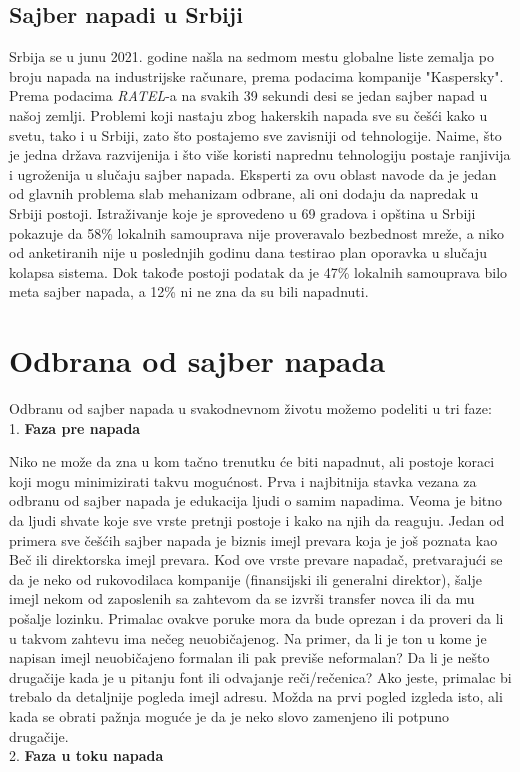 \documentclass[a4paper]{article}
\begin{document}
{\subsection{Sajber napadi u Srbiji}

Srbija se u junu 2021. godine našla na sedmom mestu globalne liste zemalja po broju napada na industrijske računare, prema podacima kompanije "Kaspersky". Prema podacima \emph{RATEL}-a na svakih 39 sekundi desi se jedan sajber napad u našoj zemlji.
Problemi koji nastaju zbog hakerskih napada sve su češći kako u svetu, tako i u Srbiji, zato što postajemo sve zavisniji od tehnologije. Naime, što je jedna država razvijenija i što više koristi naprednu tehnologiju postaje ranjivija i ugroženija u slučaju sajber napada.
Eksperti za ovu oblast navode da je jedan od glavnih problema slab mehanizam odbrane, ali oni dodaju da napredak u Srbiji postoji.
Istraživanje koje je sprovedeno u 69 gradova i opština u Srbiji pokazuje da 58\% lokalnih samouprava nije proveravalo bezbednost mreže, a niko od anketiranih nije u poslednjih godinu dana testirao plan oporavka u slučaju kolapsa sistema. Dok takođe postoji podatak da je 47\% lokalnih samouprava bilo meta sajber napada, a 12\% ni ne zna da su bili napadnuti.

\section{Odbrana od sajber napada}


Odbranu od sajber napada u svakodnevnom životu možemo podeliti u tri faze:\\
1. \textbf{Faza pre napada}

Niko ne može da zna u kom tačno trenutku će biti napadnut, ali postoje koraci koji mogu minimizirati takvu mogućnost. Prva i najbitnija stavka vezana za odbranu od sajber napada je edukacija ljudi o samim napadima. Veoma je bitno da ljudi shvate koje sve vrste pretnji postoje i kako na njih da reaguju.
Jedan od primera sve češćih sajber napada je biznis imejl prevara koja je još poznata kao Beč ili direktorska imejl prevara. Kod ove vrste prevare napadač, pretvarajući se da je neko od rukovodilaca kompanije (finansijski ili generalni direktor), šalje imejl nekom od zaposlenih sa zahtevom da se izvrši transfer novca ili da mu pošalje lozinku. Primalac ovakve poruke mora da bude oprezan i da proveri da li u takvom zahtevu ima nečeg neuobičajenog. Na primer, da li je ton u kome je napisan imejl neuobičajeno formalan ili pak previše neformalan? Da li je nešto drugačije kada je u pitanju font ili odvajanje reči/rečenica? Ako jeste, primalac bi trebalo da detaljnije pogleda imejl adresu. Možda na prvi pogled izgleda isto, ali kada se obrati pažnja moguće je da je neko slovo zamenjeno ili potpuno drugačije.\\
2. \textbf{Faza u toku napada}

}
\end{document}

